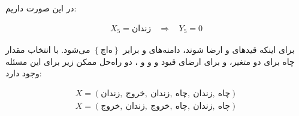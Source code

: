 \documentclass{article}
\begin{document}
\subsection{}%
در این صورت داریم: \\
\begin{fleqn}
\begin{equation}
\begin{aligned}
X_{5} = \text{زندان} \:\:\:\: \Rightarrow \:\:\:\:
Y_{5} = 0
\end{aligned}
\end{equation}
\end{fleqn}
برای اینکه قیدهای  و  ارضا شوند، دامنه‌های  و  برابر $\left\{ چاه \right\}$ می‌شود. با انتخاب مقدار چاه برای دو متغیر، و برای ارضای قیود  و  و  و ، دو راه‌حل ممکن زیر برای این مسئله وجود دارد: \\
\begin{fleqn}
\begin{equation}
\begin{aligned}
X = \left( \text{زندان}, \: \text{خروج}, \: \text{زندان}, \: \text{چاه}, \: \text{زندان}, \: \text{چاه} \right) \\
X = \left( \text{خروج}, \: \text{زندان}, \: \text{خروج}, \: \text{چاه}, \: \text{زندان}, \: \text{چاه} \right) \\
\end{aligned}
\end{equation}
\end{fleqn}

\subsection{}%
\subsection{}%
\end{document}
